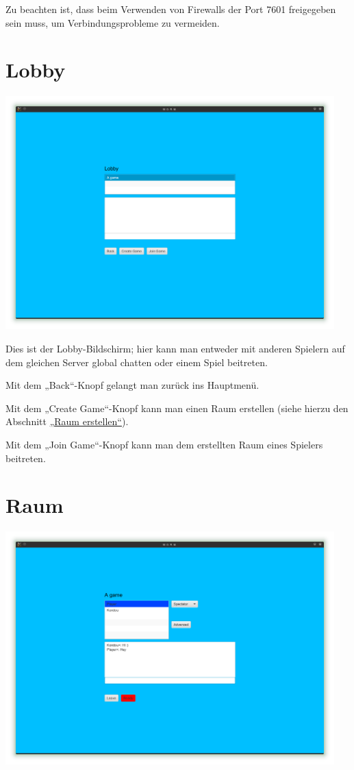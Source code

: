 \documentclass{scrreprt}
\begin{document}
Zu beachten ist, dass beim Verwenden von Firewalls der  Port 7601 freigegeben sein muss, um Verbindungsprobleme zu vermeiden.

\section{Lobby}

\includegraphics[height=9cm]{Screenshot8.png}

Dies ist der Lobby-Bildschirm; hier kann man entweder mit anderen Spielern auf dem gleichen Server global chatten oder einem
Spiel beitreten.

Mit dem „Back“-Knopf gelangt man zurück ins Hauptmenü.

Mit dem „Create Game“-Knopf kann man einen Raum erstellen (siehe hierzu den Abschnitt \hyperref[Raum]{„Raum erstellen“}).

Mit dem „Join Game“-Knopf kann man dem erstellten Raum eines Spielers beitreten.

\section{Raum}

\includegraphics[height=9cm]{Screenshot10.png}
\end{document}
